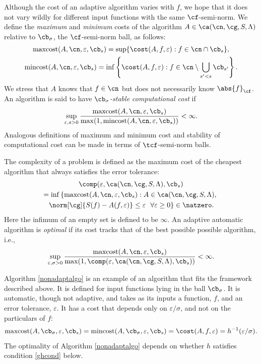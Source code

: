 \documentclass[]{elsarticle}
\DeclareMathOperator{\maxcost}{maxcost}
\DeclareMathOperator{\mincost}{mincost}
\theoremstyle{definition}
\theoremstyle{remark}
\newcommand{\Fnorm}[1]{\abs{#1}_{\cf}}
\begin{document}
Although the cost of an adaptive algorithm varies with $f$, we hope that it does not vary wildly for different input functions with the same $\cf$-semi-norm. We define the \emph{maximum} and \emph{minimum} costs of the algorithm $A\in \ca(\cn,\cg,S,\Lambda)$ relative to $\cb_{\sigma}$, the $\cf$-semi-norm ball, as follows:
\begin{gather*}
\maxcost(A,\cn,\varepsilon,\cb_s)
= \sup \{ \cost(A,f,\varepsilon) : f \in \cn \cap \cb_{s} \}, \\ \mincost(A,\cn,\varepsilon,\cb_s)
= \inf \left \{ \cost(A,f,\varepsilon) : f \in \cn\setminus \bigcup_{s'<s}\cb_{s'} \right\} .
\end{gather*}
We stress that $A$ knows that $f \in \cn$ but does not necessarily know $\Fnorm{f}$.  An algorithm is said to have \emph{$\cb_{\sigma}$-stable computational cost} if 
\begin{equation}\label{coststabledef}
\sup_{\varepsilon, s > 0} \frac{\maxcost(A,\cn,\varepsilon,\cb_s)}{\max(1,\mincost(A,\cn,\varepsilon, \cb_s))} < \infty.
\end{equation} 
Analogous definitions of maximum and minimum cost and stability of computational cost can be made in terms of $\tcf$-semi-norm balls.

The complexity of a problem is defined as the maximum cost of the cheapest algorithm that always satisfies the error tolerance:
\begin{multline} \label{complexdef}
\comp(\varepsilon,\ca(\cn,\cg,S,\Lambda),\cb_s) \\
 = \inf\left\{\maxcost(A,\cn,\varepsilon,\cb_s) : A \in \ca(\cn,\cg,S,\Lambda), \right. \\
 \left . \norm[\cg]{S(f)-A(f,\varepsilon)} \le \varepsilon \ \ \forall \varepsilon \ge 0 \right \} \in \natzero.
\end{multline}
Here the infimum of an empty set is defined to be $\infty$.  An adaptive automatic algorithm is \emph{optimal} if its cost tracks that of the best possible possible algorithm, i.e.,
\begin{equation} \label{nearoptdef}
\sup_{\varepsilon,\sigma > 0} \frac{\maxcost(A,\cn,\varepsilon,\cb_s)} {\max(1,\comp(\varepsilon,\ca(\cn,\cg,S,\Lambda),\cb_s))} <\infty.
\end{equation}

Algorithm \ref{nonadaptalgo} is an example of an algorithm that fits the framework described above.  It is defined for input functions lying in the ball $\cb_{\sigma}$.  It is automatic, though not adaptive, and takes as its inputs a function, $f$, and an error tolerance, $\varepsilon$.  It has a cost that depends only on $\varepsilon/\sigma$, and not on the particulars of $f$:
\begin{equation} \label{nonadaptalgocost}
\maxcost(A,\cb_{\sigma},\varepsilon,\cb_{s}) = \mincost(A,\cb_{\sigma},\varepsilon,\cb_{s}) = \cost(A,f,\varepsilon) = h^{-1}(\varepsilon/\sigma).
\end{equation}
The optimality of Algorithm \ref{nonadaptalgo} depends on whether $h$ satisfies condition \eqref{ghcond} below.
\end{document}
